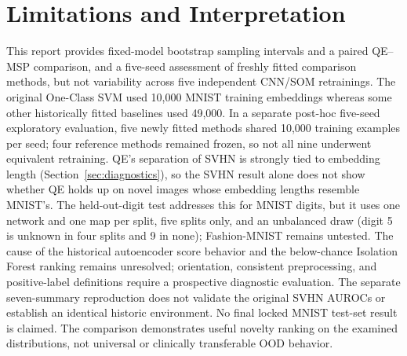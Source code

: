 \documentclass[11pt]{article}
\begin{document}
\section{Limitations and Interpretation}
This report provides fixed-model bootstrap sampling intervals and a paired QE--MSP comparison, and a five-seed assessment of freshly fitted comparison methods, but not variability across five independent CNN/SOM retrainings. The original One-Class SVM used 10,000 MNIST training embeddings whereas some other historically fitted baselines used 49,000. In a separate post-hoc five-seed exploratory evaluation, five newly fitted methods shared 10,000 training examples per seed; four reference methods remained frozen, so not all nine underwent equivalent retraining. QE's separation of SVHN is strongly tied to embedding length (Section~\ref{sec:diagnostics}), so the SVHN result alone does not show whether QE holds up on novel images whose embedding lengths resemble MNIST's. The held-out-digit test addresses this for MNIST digits, but it uses one network and one map per split, five splits only, and an unbalanced draw (digit 5 is unknown in four splits and 9 in none); Fashion-MNIST remains untested. The cause of the historical autoencoder score behavior and the below-chance Isolation Forest ranking remains unresolved; orientation, consistent preprocessing, and positive-label definitions require a prospective diagnostic evaluation. The separate seven-summary reproduction does not validate the original SVHN AUROCs or establish an identical historic environment. No final locked MNIST test-set result is claimed. The comparison demonstrates useful novelty ranking on the examined distributions, not universal or clinically transferable OOD behavior.
\end{document}
